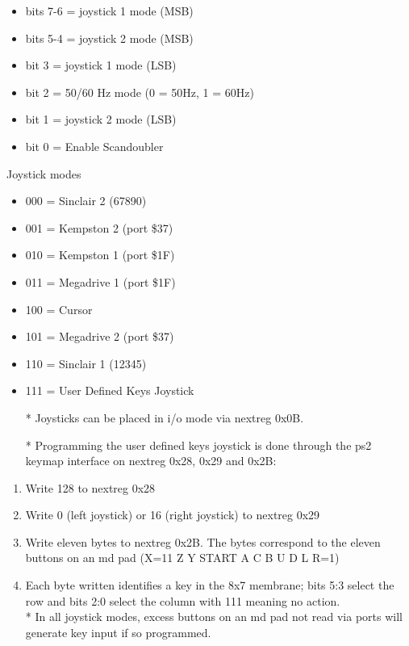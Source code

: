 \begin{itemize}
\item bits 7-6 = joystick 1 mode (MSB)
\item bits 5-4 = joystick 2 mode (MSB)
\item bit 3 = joystick 1 mode (LSB)
\item bit 2 = 50/60 Hz mode (0 = 50Hz, 1 = 60Hz)
\item bit 1 = joystick 2 mode (LSB)
\item bit 0 = Enable Scandoubler
\end{itemize}
Joystick modes
\begin{itemize}
\item 000 = Sinclair 2 (67890)
\item 001 = Kempston 2 (port \$37)
\item 010 = Kempston 1 (port \$1F)
\item 011 = Megadrive 1 (port \$1F)
\item 100 = Cursor
\item 101 = Megadrive 2 (port \$37)
\item 110 = Sinclair 1 (12345)
\item 111 = User Defined Keys Joystick
\end{itemize}
\begin{itemize}
\item[*] Joysticks can be placed in i/o mode via nextreg 0x0B.
\item[*] Programming the user defined keys joystick is done through the ps2
keymap interface on nextreg 0x28, 0x29 and 0x2B:
\end{itemize}
\begin{enumerate}
\item Write 128 to nextreg 0x28
\item Write 0 (left joystick) or 16 (right joystick) to nextreg 0x29
\item Write eleven bytes to nextreg 0x2B. The bytes correspond to the eleven
buttons on an md pad (X=11 Z Y START A C B U D L R=1)
\item Each byte written identifies a key in the 8x7 membrane; bits 5:3 select
the row and bits 2:0 select the column with 111 meaning no action.\\ *
In all joystick modes, excess buttons on an md pad not read via ports
will generate key input if so programmed.
\end{enumerate}


